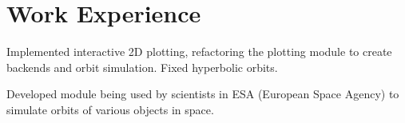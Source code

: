 \documentclass[a4paper]{deedy-resume-openfont}
\begin{document}
\begin{minipage}[t]{0.66\textwidth} 




\section{Work Experience}

\vspace{\topsep} %
\begin{tightemize}
\item Implemented interactive 2D plotting, refactoring the plotting module to create backends and orbit simulation. Fixed hyperbolic orbits.
\item Developed module being used by scientists in ESA (European Space Agency) to simulate orbits of various objects in space.

\end{tightemize}




\end{minipage}
\end{document}
